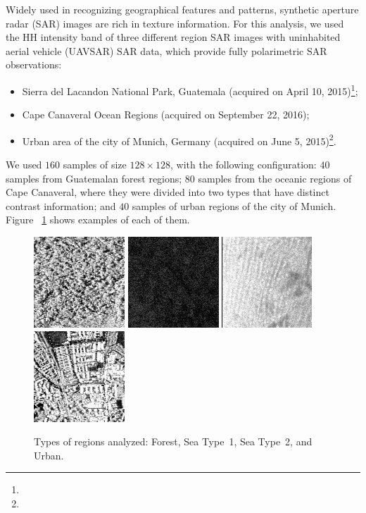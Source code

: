 \documentclass{isprs}
\begin{document}
	Widely used in recognizing geographical features and patterns, synthetic aperture radar (SAR) images are rich in texture information.
	For this analysis, we used the HH intensity band of three different region SAR images with uninhabited aerial vehicle (UAVSAR) SAR data, which provide fully polarimetric SAR observations:
	\begin{itemize}
		\item Sierra del Lacandon National Park, Guatemala (acquired on April 10, 2015)\footnote{};
		\item Cape Canaveral Ocean Regions (acquired on September 22, 2016);
		\item Urban area of the city of Munich, Germany (acquired on June 5, 2015)\footnote{}.
	\end{itemize}
	
	We used $160$ samples of size $128\times128$, with the following configuration:
	$40$ samples from Guatemalan forest regions;
	$80$ samples from the oceanic regions of Cape Canaveral, where they were divided into two types that have distinct contrast information; and
	$40$ samples of urban regions of the city of Munich.
	Figure ~\ref{fig:RegionsSAR} shows examples of each of them.
	
	\begin{figure}[hbt]
		\centering
		\includegraphics[width=.23\linewidth]{Figures/guatemalaflorest}
		\includegraphics[width=.23\linewidth]{Figures/Cape1}
		\includegraphics[width=.23\linewidth]{Figures/Cape2}
		\includegraphics[width=.23\linewidth]{Figures/munichUrban}	
		\caption{Types of regions analyzed: Forest, Sea Type~1, Sea Type~2, and Urban.}\label{fig:RegionsSAR}
	\end{figure} 
	
\end{document}
